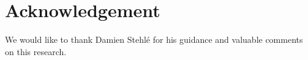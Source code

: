 \documentclass[runningheads]{llncs}
\newcommand{\cc}[1]{\mathcal{#1}} %
\newcommand{\PE}{\textsf{PE}{}}
\newcommand{\REQ}{\textsf{ReQ}}
\newcommand{\dec}{\textsf{Dec}}
\newcommand{\dhnote}[1]{{ }\textcolor{red}{[NOTE: {#1}]}}
\begin{document}



\section*{Acknowledgement}
We would like to thank Damien Stehl{\'e} for his guidance and valuable comments on this research. 




\end{document}

